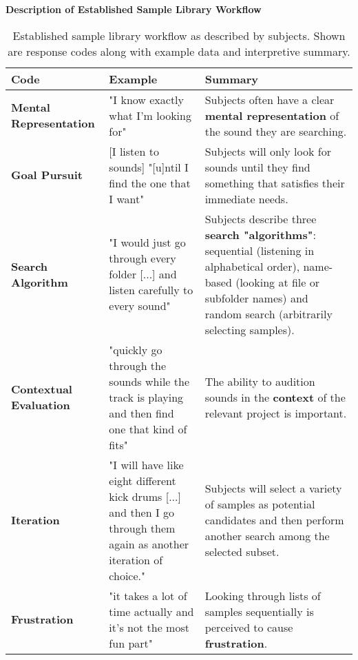 \begin{table}[!htb]
  \renewcommand{\arraystretch}{1.2}
  \centering
  \textbf{Description of Established Sample Library Workflow} \\ [3mm]
  \footnotesize
  \colorbox{light-bg}{
  \begin{tabular}{ p{4.0cm} p{4.75cm} p{4.75cm} }
  \hline
    \textbf{Code} & \textbf{Example} & \textbf{Summary} \\
    \hline
    \textbf{Mental Representation}
    &
    "I know exactly what I'm looking for"
    &
    Subjects often have a clear \textbf{mental representation} of the sound they
    are searching.
    \\
    \textbf{Goal Pursuit}
    &
    [I listen to sounds] "[u]ntil I find the one that I want"
    &
    Subjects will only look for sounds until they find something that satisfies
    their immediate needs.
    \\
    \textbf{Search Algorithm}
    &
    "I would just go through every folder [...] and listen carefully to every
    sound"
    &
    Subjects describe three \textbf{search "algorithms"}: sequential
    (listening in alphabetical order), name-based (looking at file or subfolder
    names) and random search (arbitrarily selecting samples).
    \\
    \textbf{Contextual Evaluation}
    &
    "quickly go through the sounds while the track is playing and then find
    one that kind of fits"
    &
    The ability to audition sounds in the \textbf{context} of the relevant
    project is important.
    \\
    \textbf{Iteration}
    &
    "I will have like eight different kick drums [...] and then I go through
    them again as another iteration of choice."
    &
    Subjects will select a variety of samples as potential candidates and then
    perform another search among the selected subset.
    \\
    \textbf{Frustration}
    &
    "it takes a lot of time actually and it's not the most fun part"
    &
    Looking through lists of samples sequentially is perceived to cause
    \textbf{frustration}.
    \\
  \end{tabular}}
  \caption[Established Sample Library Workflow Description: Response Codes]
  {Established sample library workflow as described by subjects. Shown are
  response codes along with example data and interpretive summary.}
  \label{table:current_workflow_description}
\end{table}

